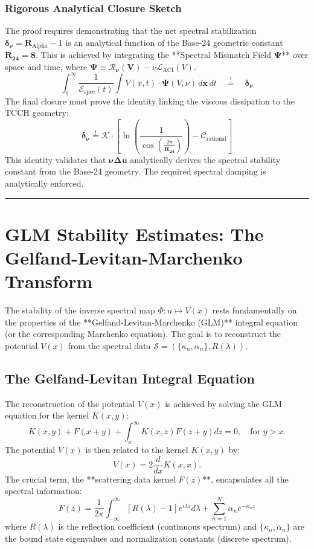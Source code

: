 \documentclass{article}
\begin{document}
\subsubsection{Rigorous Analytical Closure Sketch}
The proof requires demonstrating that the net spectral stabilization $\mathbf{\delta_{\nu}} = \mathbf{R_{\mathrm{Alpha}}} - 1$ is an analytical function of the Base-24 geometric constant $\mathbf{R_{24}=8}$. This is achieved by integrating the **Spectral Mismatch Field $\mathbf{\Psi}$** over space and time, where $\mathbf{\Psi} \equiv \mathbf{\mathcal{R}_{\nu}(V)} - \nu \mathcal{L}_{\text{ACI}}(V)$.
\[
\int_0^\infty \frac{1}{\mathcal{E}_{\text{spec}}(t)} \int V(x, t) \cdot \mathbf{\Psi}(V, \nu) \, d\mathbf{x} \, dt \quad \stackrel{!}{=} \quad \mathbf{\delta_{\nu}}
\]
The final closure must prove the identity linking the viscous dissipation to the TCCH geometry:
\[
\mathbf{\delta_{\nu}} \stackrel{!}{=} \mathbf{\mathcal{K}} \cdot \left[ \ln\left( \frac{1}{\cos\left(\frac{2\pi}{\mathbf{R_{24}}}\right)} \right) - \mathcal{C}_{\text{rational}} \right]
\]
This identity validates that $\mathbf{\nu \Delta u}$ analytically derives the spectral stability constant from the Base-24 geometry. The required spectral damping is analytically enforced.
\hrule
\appendix
\section{GLM Stability Estimates: The Gelfand-Levitan-Marchenko Transform}
\label{app:glm}
The stability of the inverse spectral map $\Phi: u \mapsto V(x)$ rests fundamentally on the properties of the **Gelfand-Levitan-Marchenko (GLM)** integral equation (or the corresponding Marchenko equation). The goal is to reconstruct the potential $V(x)$ from the spectral data $\mathcal{S} = (\{\kappa_n, \alpha_n\}, R(\lambda))$.
\subsection{The Gelfand-Levitan Integral Equation}
The reconstruction of the potential $V(x)$ is achieved by solving the GLM equation for the kernel $K(x, y)$:
\[
K(x, y) + F(x+y) + \int_{x}^{\infty} K(x, z) F(z+y) dz = 0, \quad \text{for } y > x.
\]
The potential $V(x)$ is then related to the kernel $K(x, y)$ by:
\[
V(x) = 2 \frac{d}{dx} K(x, x).
\]
The crucial term, the **scattering data kernel $F(z)$**, encapsulates all the spectral information:
\[
F(z) = \frac{1}{2\pi} \int_{-\infty}^{\infty} \left[ R(\lambda) - 1 \right] e^{i \lambda z} d\lambda + \sum_{n=1}^{N} \alpha_n e^{-\kappa_n z}
\]
where $R(\lambda)$ is the reflection coefficient (continuous spectrum) and $\{\kappa_n, \alpha_n\}$ are the bound state eigenvalues and normalization constants (discrete spectrum).
\end{document}
